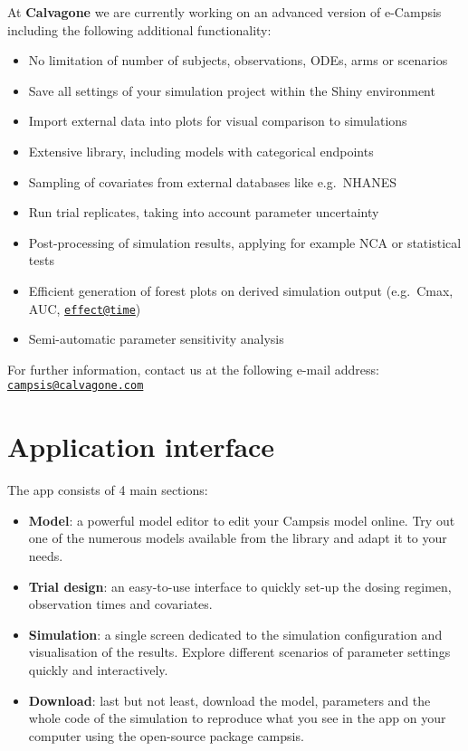 \documentclass[
]{book}
\providecommand{\tightlist}{%
  \setlength{\itemsep}{0pt}\setlength{\parskip}{0pt}}
\begin{document}
At \textbf{Calvagone} we are currently working on an advanced version of e-Campsis including the following additional functionality:

\begin{itemize}
\tightlist
\item
  No limitation of number of subjects, observations, ODEs, arms or scenarios
\item
  Save all settings of your simulation project within the Shiny environment
\item
  Import external data into plots for visual comparison to simulations
\item
  Extensive library, including models with categorical endpoints
\item
  Sampling of covariates from external databases like e.g.~NHANES
\item
  Run trial replicates, taking into account parameter uncertainty
\item
  Post-processing of simulation results, applying for example NCA or statistical tests
\item
  Efficient generation of forest plots on derived simulation output (e.g.~Cmax, AUC, \href{mailto:effect@time}{\nolinkurl{effect@time}})
\item
  Semi-automatic parameter sensitivity analysis
\end{itemize}

For further information, contact us at the following e-mail address: \href{mailto:campsis@calvagone.com}{\nolinkurl{campsis@calvagone.com}}

\hypertarget{application-interface}{%
\section{Application interface}\label{application-interface}}

The app consists of 4 main sections:

\begin{itemize}
\tightlist
\item
  \textbf{Model}: a powerful model editor to edit your Campsis model online. Try out one of the numerous models available from the library and adapt it to your needs.
\item
  \textbf{Trial design}: an easy-to-use interface to quickly set-up the dosing regimen, observation times and covariates.
\item
  \textbf{Simulation}: a single screen dedicated to the simulation configuration and visualisation of the results. Explore different scenarios of parameter settings quickly and interactively.
\item
  \textbf{Download}: last but not least, download the model, parameters and the whole code of the simulation to reproduce what you see in the app on your computer using the open-source package campsis.
\end{itemize}
\end{document}
